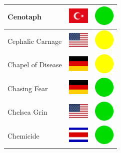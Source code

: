 \documentclass[12pt, a4paper, twoside]{report}
\begin{document}
\begin{center}
\begin{longtable}{|p{5cm}|p{2cm}|p{2cm}|}
 Cenotaph                                                   & \includegraphics[width=1cm]{../4x3/tr} &   \includegraphics[width=1cm]{../likes/y} \\ \hline
 Cephalic Carnage                                           & \includegraphics[width=1cm]{../4x3/us} &   \includegraphics[width=1cm]{../likes/m} \\ \hline
 Chapel of Disease                                          & \includegraphics[width=1cm]{../4x3/de} &   \includegraphics[width=1cm]{../likes/m} \\ \hline
 Chasing Fear                                               & \includegraphics[width=1cm]{../4x3/de} &   \includegraphics[width=1cm]{../likes/y} \\ \hline
 Chelsea Grin                                               & \includegraphics[width=1cm]{../4x3/us} &   \includegraphics[width=1cm]{../likes/y} \\ \hline
 Chemicide                                                  & \includegraphics[width=1cm]{../4x3/cr} &   \includegraphics[width=1cm]{../likes/y} \\ \hline

\end{longtable}
\end{center}
\end{document}

